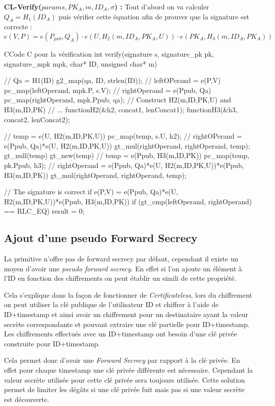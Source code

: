 \textbf{CL-Verify($params, PK_A,  m, ID_A, \sigma$) :} Tout d'abord on va calculer $Q_A = H_1(ID_A)$ puis vérifier cette équation afin de prouver que la signature est correcte :
\[e(V,P) = e(P_{pub}, Q_A) \cdot e(U, H_2(m, ID_A, PK_A,U)) \cdot e(PK_A, H_3(m, ID_A, PK_A)) \]

\begin{sourcebox}{C}{Code C pour la vérification}
	int verify(signature s, signature_pk pk, signature_mpk mpk, char* ID, unsigned char* m){
		// Qa = H1(ID)
		g2_map(qa, ID, strlen(ID));
		// leftOPerand = e(P,V)
		pc_map(leftOperand, mpk.P, s.V);
		// rightOperand = e(Ppub, Qa)
		pc_map(rightOperand, mpk.Ppub, qa);
		// Construct H2(m,ID,PK,U) and H3(m,ID,PK)
		// ...
		functionH2(&h2, concat1, lenConcat1);
		functionH3(&h3, concat2, lenConcat2);
		
		// temp = e(U, H2(m,ID,PK,U))
		pc_map(temp, s.U, h2);
		// rightOPerand = e(Ppub, Qa)*e(U, H2(m,ID,PK,U))
		gt_mul(rightOperand, rightOperand, temp);
		gt_null(temp)
		gt_new(temp)
		// temp = e(Ppub, H3(m,ID,PK))
		pc_map(temp, pk.Ppub, h3);
		// rightOperand = e(Ppub, Qa)*e(U, H2(m,ID,PK,U))*e(Ppub, H3(m,ID,PK))
		gt_mul(rightOperand, rightOperand, temp);
		
		// The signature is correct if e(P,V) = e(Ppub, Qa)*e(U, H2(m,ID,PK,U))*e(Ppub, H3(m,ID,PK))
		if (gt_cmp(leftOperand, rightOperand) == RLC_EQ) {
			result = 0;
		}
	}
\end{sourcebox}

\subsection{Ajout d'une pseudo Forward Secrecy}
\label{subsec:pseudoSecrecy}
La primitive n'offre pas de forward secrecy par défaut, cependant il existe un moyen d'avoir une \textit{pseudo forward secrecy}. En effet si l'on ajoute un élément à l'ID en fonction des chiffrements on peut établir un simili de cette propriété.

Cela s'explique dans la façon de fonctionner de \textit{Certificateless}, lors du chiffrement on peut utiliser la clé publique de l'utilisateur ID et chiffrer à l'aide de ID+timestamp et ainsi avoir un chiffrement pour un destinataire ayant la valeur secrète correspondante et pouvant extraire une clé partielle pour ID+timestamp. Les chiffrements effectués avec un ID+timestamp ont besoin d'une clé privée construite pour ID+timestamp.

Cela permet donc d'avoir une \textit{Forward Secrecy} par rapport à la clé privée. En effet pour chaque timestamp une clé privée différente est nécessaire. Cependant la valeur secrète utilisée pour cette clé privée sera toujours utilisée. Cette solution permet de limiter les dégâts si une clé privée fuit mais pas si une valeur secrète est découverte.

